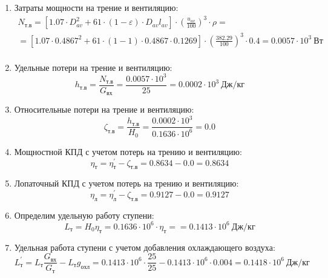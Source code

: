 \documentclass[a4paper,10pt]{article}
\begin{document}
\begin{enumerate}
        \item Затраты мощности на трение и вентиляцию:
        \begin{gather*}
            N_{т.в} = \left[
                    1.07 \cdot D_{av}^2 + 61 \cdot (1 - \varepsilon) \cdot D_{av} l_{av}
            \right] \cdot
            \left(
                \frac{ u_{av} }{ 100 }
            \right) ^ 3 \cdot
            \rho =\\
            = \left[
                1.07 \cdot 0.4867^2 +
                61 \cdot (1 - 1) \cdot
                0.4867 \cdot 0.1269
            \right] \cdot
            \left(
                \frac{ 382.29 }{ 100 }
            \right) ^ 3 \cdot
            0.4
            = 0.0057 \cdot 10^3 \ Вт \\
        \end{gather*}

        \item Удельные потери на трение и вентиляцию:
        \[
            h_{т.в} = \frac{ N_{т.в} }{ G_{вх} } =
                \frac{
                    0.0057 \cdot 10^3
                }{
                    25
                }
            = 0.0002 \cdot 10^3 \ Дж/кг
        \]

        \item Относительные потери на трение и вентиляцию:
        \[
            \zeta_{т.в} = \frac{ h_{т.в} }{ H_0 } =
                \frac{ 0.0002 \cdot 10^3 }{ 0.1636 \cdot 10^6 } =
            0.0
        \]

        \item Мощностной КПД с учетом потерь на трению и вентиляцию:
        \[
            \eta_т = \eta_т^\prime - \zeta_{т.в} =
                0.8634 - 0.0 =
            0.8634
        \]

        \item Лопаточный КПД с учетом потерь на трению и вентиляцию:
        \[
            \eta_л = \eta_л^\prime - \zeta_{т.в} =
                0.9127 - 0.0 =
            0.9127
        \]

        
        \item Определим удельную работу ступени:
        \[
            L_т = H_0 \eta_т = 0.1636 \cdot 10^6 \cdot \eta_т =
            = 0.1413 \cdot 10^6 \ Дж/кг
        \]
        

        \item Удельная работа ступени с учетом добавления охлаждающего воздуха:
        \[
            L_т^\prime = L_т \frac{ G_{вх} }{ G_т }  - L_т g_{охл} =
                0.1413 \cdot 10^6 \cdot
                \frac{ 25 }{ 25 }  -
                0.1413 \cdot 10^6 \cdot 0.004 =
            0.1418 \cdot 10^6 \ Дж/кг
        \]


\end{enumerate}
\end{document}
